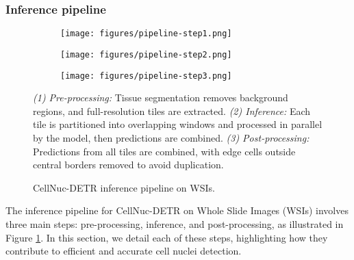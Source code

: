 \subsubsection{Inference pipeline}
\label{sec:methods:CellNuc-DETR:inference}

\begin{figure}[h!]
    \centering
    \begin{subfigure}[t]{\textwidth}
        \centering
        \texttt{[image: figures/pipeline-step1.png]} %
    \end{subfigure}
    

    \begin{subfigure}[t]{\textwidth}
        \centering
        \texttt{[image: figures/pipeline-step2.png]} %
    \end{subfigure}
    

    \begin{subfigure}[t]{\textwidth}
        \centering
        \texttt{[image: figures/pipeline-step3.png]} %
    \end{subfigure}
    
    \caption{CellNuc-DETR inference pipeline on WSIs.}
    \label{fig:pipeline}
    \footnotesize{
    \textit{(1) Pre-processing:}  Tissue segmentation removes background regions, and full-resolution tiles are extracted. \textit{(2) Inference:} Each tile is partitioned into overlapping windows and processed in parallel by the model, then predictions are combined. \textit{(3) Post-processing:} Predictions from all tiles are combined, with edge cells outside central borders removed to avoid duplication.
    }
\end{figure}

The inference pipeline for CellNuc-DETR on Whole Slide Images (WSIs) involves three main steps: pre-processing, inference, and post-processing, as illustrated in Figure \ref{fig:pipeline}. In this section, we detail each of these steps, highlighting how they contribute to efficient and accurate cell nuclei detection.

